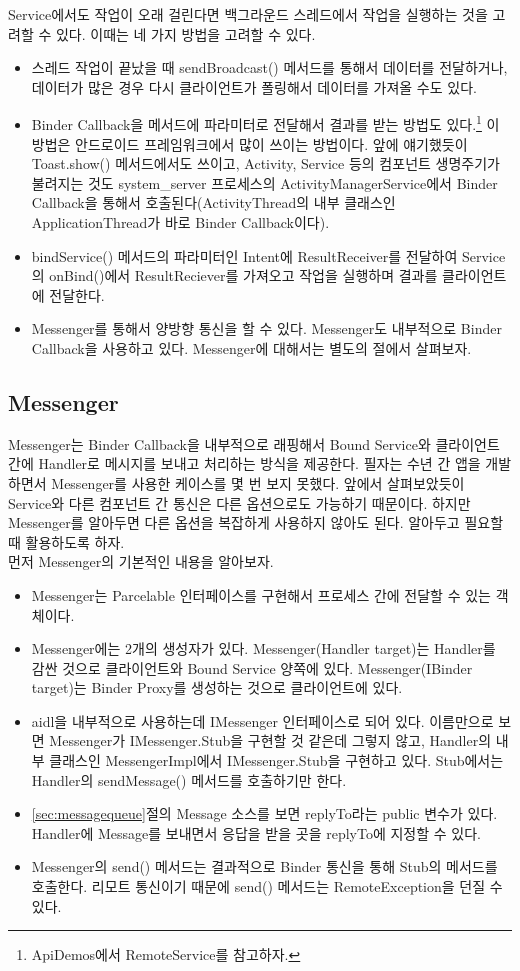 Service에서도 작업이 오래 걸린다면 백그라운드 스레드에서 작업을 실행하는 것을 고려할 수 있다. 이때는 네 가지 방법을 고려할 수 있다.
\begin{itemize}
\item 스레드 작업이 끝났을 때 sendBroadcast() 메서드를 통해서 데이터를 전달하거나, 데이터가 많은 경우 다시 클라이언트가 폴링해서 데이터를 가져올 수도 있다.
\item Binder Callback을 메서드에 파라미터로 전달해서 결과를 받는 방법도 있다.\footnote{ApiDemos에서 RemoteService를 참고하자.} 이 방법은 안드로이드 프레임워크에서 많이 쓰이는 방법이다. 앞에 얘기했듯이 Toast.show() 메서드에서도 쓰이고, Activity, Service 등의 컴포넌트 생명주기가 불려지는 것도 system\_server 프로세스의 ActivityManagerService에서 Binder Callback을 통해서 호출된다(ActivityThread의 내부 클래스인 ApplicationThread가 바로 Binder Callback이다).
\item bindService() 메서드의 파라미터인 Intent에 ResultReceiver를 전달하여 Service의 onBind()에서 ResultReciever를 가져오고 작업을 실행하며 결과를 클라이언트에 전달한다.
\item Messenger를 통해서 양방향 통신을 할 수 있다. Messenger도 내부적으로 Binder Callback을 사용하고 있다. Messenger에 대해서는 별도의 절에서 살펴보자.
\end{itemize}

\subsection{Messenger}
\label{subsec:messenger}
Messenger는 Binder Callback을 내부적으로 래핑해서 Bound Service와 클라이언트 간에 Handler로 메시지를 보내고 처리하는 방식을 제공한다.
필자는 수년 간 앱을 개발하면서 Messenger를 사용한 케이스를 몇 번 보지 못했다. 
앞에서 살펴보았듯이 Service와 다른 컴포넌트 간 통신은 다른 옵션으로도 가능하기 때문이다. 
하지만 Messenger를 알아두면 다른 옵션을 복잡하게 사용하지 않아도 된다. 알아두고 필요할 때 활용하도록 하자.\\

먼저 Messenger의 기본적인 내용을 알아보자. 
\begin{itemize}
\item Messenger는 Parcelable 인터페이스를 구현해서 프로세스 간에 전달할 수 있는 객체이다.
\item Messenger에는 2개의 생성자가 있다. Messenger(Handler target)는 Handler를 감싼 것으로 클라이언트와 Bound Service 양쪽에 있다. Messenger(IBinder target)는 Binder Proxy를 생성하는 것으로 클라이언트에 있다.
\item aidl을 내부적으로 사용하는데 IMessenger 인터페이스로 되어 있다. 
이름만으로 보면 Messenger가 IMessenger.Stub을 구현할 것 같은데 그렇지 않고, Handler의 내부 클래스인 MessengerImpl에서 IMessenger.Stub을 구현하고 있다. Stub에서는 Handler의 sendMessage() 메서드를 호출하기만 한다.
\item \ref{sec:messagequeue}절의 Message 소스를 보면 replyTo라는 public 변수가 있다. Handler에 Message를 보내면서 응답을 받을 곳을 replyTo에 지정할 수 있다.
\item Messenger의 send() 메서드는 결과적으로 Binder 통신을 통해 Stub의 메서드를 호출한다. 리모트 통신이기 때문에 send() 메서드는 RemoteException을 던질 수 있다. 
\end{itemize}

